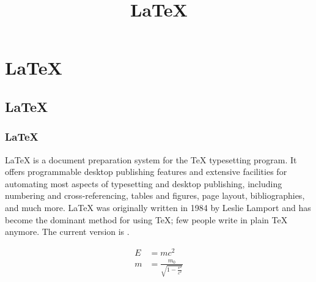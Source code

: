 \documentclass[12pt]{article}
\title{\LaTeX}
\date{}
\begin{document}
\maketitle
\section{\LaTeX{}}
\subsection{\LaTeX{}}
\subsubsection{\LaTeX{}}
\LaTeX{} is a document preparation system for the \TeX{}
typesetting program. It offers programmable desktop publishing
features and extensive facilities for automating most aspects of
typesetting and desktop publishing, including numbering and
cross-referencing, tables and figures, page layout, bibliographies,
and much more. \LaTeX{} was originally written in 1984 by Leslie
Lamport and has become the dominant method for using \TeX; few
people write in plain \TeX{} anymore. The current version is
\LaTeXe.

    \begin{align}
    E &= mc^2                              \\
         m &= \frac{m_0}{\sqrt{1-\frac{v^2}{c^2}}}
    \end{align}
\end{document}
